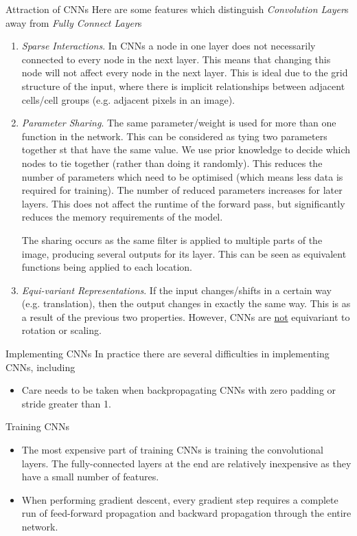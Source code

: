 \documentclass[11pt,a4paper]{article}
\begin{document}
  \begin{remark}{Attraction of CNNs}
    Here are some features which distinguish \textit{Convolution Layer}s away from \textit{Fully Connect Layer}s
    \begin{enumerate}
      \item \textit{Sparse Interactions}. In CNNs a node in one layer does not necessarily connected to every node in the next layer. This means that changing this node will not affect every node in the next layer. This is ideal due to the grid structure of the input, where there is implicit relationships between adjacent cells/cell groups (e.g. adjacent pixels in an image).
      \item \textit{Parameter Sharing}. The same parameter/weight is used for more than one function in the network. This can be considered as tying two parameters together st that have the same value. We use prior knowledge to decide which nodes to tie together (rather than doing it randomly). This reduces the number of parameters which need to be optimised (which means less data is required for training). The number of reduced parameters increases for later layers. This does not affect the runtime of the forward pass, but significantly reduces the memory requirements of the model.
      \par The sharing occurs as the same filter is applied to multiple parts of the image, producing several outputs for its layer. This can be seen as equivalent functions being applied to each location.

      \item \textit{Equi-variant Representations}. If the input changes/shifts in a certain way (e.g. translation), then the output changes in exactly the same way. This is as a result of the previous two properties. However, CNNs are \underline{not} equivariant to rotation or scaling.
    \end{enumerate}
  \end{remark}

  \begin{remark}{Implementing CNNs}
    In practice there are several difficulties in implementing CNNs, including
    \begin{itemize}
      \item Care needs to be taken when backpropagating CNNs with zero padding or stride greater than 1.
    \end{itemize}
  \end{remark}

  \begin{remark}{Training CNNs}
    \begin{itemize}
      \item The most expensive part of training CNNs is training the convolutional layers. The fully-connected layers at the end are relatively inexpensive as they have a small number of features.
      \item When performing gradient descent, every gradient step requires a complete run of feed-forward propagation and backward propagation through the entire network.
    \end{itemize}
  \end{remark}
\end{document}
